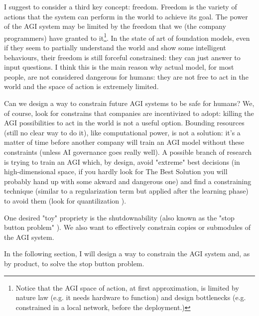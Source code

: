 \documentclass{article}
\begin{document}
I suggest to consider a third key concept: freedom. 
Freedom is the variety of actions that the system can perform in the world to achieve its goal.
The power of the AGI system may be limited by the freedom that we (the company programmers) have granted 
to it\footnote{Notice that the AGI space of action, at first approximation, is limited by nature law (e.g. it needs hardware to function) 
and design bottlenecks (e.g. constrained in a local network, before the deployment.)}.
In the state of art of foundation models, even if they seem to partially understand the world and show some intelligent behaviours, 
their freedom is still forceful constrained: they can just answer to input questions.
I think this is the main reason why actual model, for most people, are not considered dangerous for humans: 
they are not free to act in the world and the space of action is extremely limited.

Can we design a way to constrain future AGI systems to be safe for humans? 
We, of course, look for constrains that companies are incentivized to adopt: killing 
the AGI possibilities to act in the world is not a useful option.
Bounding resources (still no clear way to do it), like computational power, is not a 
solution: it's a matter of time before another company will train an AGI model without these constraints (unless AI governance goes really well).
A possible branch of research is trying to train an AGI which, by design, avoid "extreme" best decisions (in high-dimensional space, if you hardly look for The Best Solution you will probably hand up with some akward and dangerous one) 
and find a constraining technique (similar to a regularization term but applied after the learning phase) to avoid them (look for quantilization \cite*[postnote]{boh}).

One desired "toy" propriety is the shutdownability (also known as the "stop button problem" \cite{corrigibility}).
We also want to effectively constrain copies or submodules of the AGI system.

In the following section, I will design a way to constrain the AGI system and, as by product, to solve the stop button problem.
\end{document}
